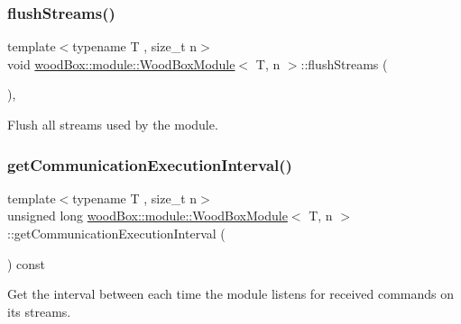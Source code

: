 \subsubsection{\texorpdfstring{flush\+Streams()}{flushStreams()}}
{\footnotesize\ttfamily template$<$typename T , size\+\_\+t n$>$ \\
void \mbox{\hyperlink{classwood_box_1_1module_1_1_wood_box_module}{wood\+Box\+::module\+::\+Wood\+Box\+Module}}$<$ T, n $>$\+::flush\+Streams (\begin{DoxyParamCaption}{ }\end{DoxyParamCaption})\hspace{0.3cm}{\ttfamily [inline]}, {\ttfamily [protected]}}

Flush all streams used by the module. \mbox{\label{classwood_box_1_1module_1_1_wood_box_module_ad4a7b447a617d9c6908ef624cfd2cab4}} 
\subsubsection{\texorpdfstring{get\+Communication\+Execution\+Interval()}{getCommunicationExecutionInterval()}}
{\footnotesize\ttfamily template$<$typename T , size\+\_\+t n$>$ \\
unsigned long \mbox{\hyperlink{classwood_box_1_1module_1_1_wood_box_module}{wood\+Box\+::module\+::\+Wood\+Box\+Module}}$<$ T, n $>$\+::get\+Communication\+Execution\+Interval (\begin{DoxyParamCaption}{ }\end{DoxyParamCaption}) const\hspace{0.3cm}{\ttfamily [inline]}}

Get the interval between each time the module listens for received commands on its streams. \mbox{\label{classwood_box_1_1module_1_1_wood_box_module_a3f13bd3a6318ddf2a7db84f86b198a49}} 
